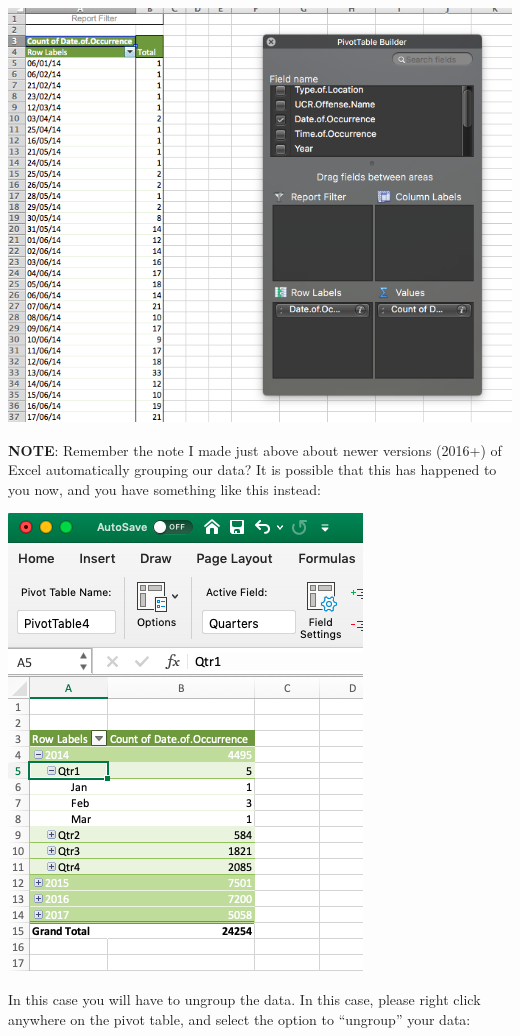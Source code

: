 \documentclass[
]{book}
\begin{document}
\includegraphics{imgs/burg_day_pivot.png}

\textbf{NOTE}: Remember the note I made just above about newer versions (2016+) of Excel automatically grouping our data? It is possible that this has happened to you now, and you have something like this instead:

\includegraphics{imgs/ex_2016_aggr.png}

In this case you will have to ungroup the data. In this case, please right click anywhere on the pivot table, and select the option to ``ungroup'' your data:
\end{document}
